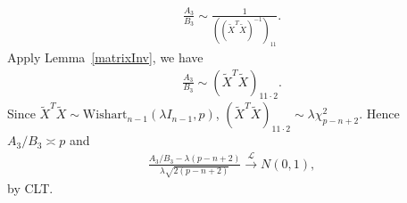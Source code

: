 \documentclass[review]{elsarticle}
\theoremstyle{plain}
\theoremstyle{definition}
\theoremstyle{remark}
\begin{document}
\begin{equation*}
    \begin{aligned}
        \frac{A_3}{B_3}\sim 
        \frac{1}{{({(\tilde{X}^T\tilde{X})}^{-1})}_{11}}.
    \end{aligned}
\end{equation*}
Apply Lemma~\ref{matrixInv}, we have 
\begin{equation*}
    \begin{aligned}
        \frac{A_3}{B_3}\sim 
        {(\tilde{X}^T\tilde{X})}_{11\cdot 2}.
    \end{aligned}
\end{equation*}
Since $\tilde{X}^T \tilde{X}\sim \textrm{Wishart}_{n-1}(\lambda I_{n-1},p)$, ${(\tilde{X}^T\tilde{X})}_{11\cdot 2}\sim \lambda \chi^2_{p-n+2}$. Hence $A_3/B_3\asymp p$ and
\begin{equation*}
    \begin{aligned}
        \frac{A_3/B_3-\lambda (p-n+2)}{\lambda\sqrt{2(p-n+2)}
        }\xrightarrow{\mathcal{L}}N(0,1),
    \end{aligned}
\end{equation*}
by CLT.\
\end{document}
